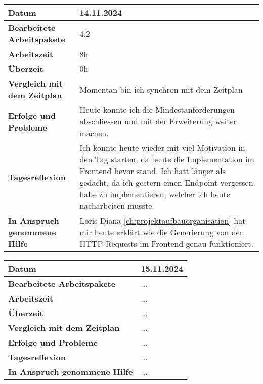 \begin{longtable}{p{}|p{}}
	\hline
	\textbf{Datum}                       & 14.11.2024            \\
	\hline
	\textbf{Bearbeitete Arbeitspakete}   & 4.2                  \\
	\hline
	\textbf{Arbeitszeit}                 & 8h                                    \\
	\hline
	\textbf{Überzeit}                    & 0h                                    \\
	\hline
	\textbf{Vergleich mit dem Zeitplan}  & Momentan bin ich synchron mit dem Zeitplan \\
	\hline
	\textbf{Erfolge und Probleme} & Heute konnte ich die Mindestanforderungen abschliessen und mit der Erweiterung weiter machen.
	\\
	\hline
	\textbf{Tagesreflexion} & Ich konnte heute wieder mit viel Motivation in den Tag starten, da heute die Implementation im Frontend bevor stand. Ich hatt länger als gedacht, da ich gestern einen Endpoint vergessen habe zu implementieren, welcher ich heute nacharbeiten musste.
	\\
	\hline
	\textbf{In Anspruch genommene Hilfe} & Loris Diana \ref{ch:projektaufbauorganisation} hat mir heute erklärt wie die Generierung von den HTTP-Requests im Frontend genau funktioniert.                              \\
	\hline
\end{longtable}\label{tab:arbeitsprotokoll-14.11.2024}
\newpage

\begin{longtable}{p{}|p{}}
	\hline
	\textbf{Datum}                       & 15.11.2024            \\
	\hline
	\textbf{Bearbeitete Arbeitspakete}   & ...                  \\
	\hline
	\textbf{Arbeitszeit}                 & ...                                    \\
	\hline
	\textbf{Überzeit}                    & ...                                    \\
	\hline
	\textbf{Vergleich mit dem Zeitplan}  & ... \\
	\hline
	\textbf{Erfolge und Probleme} & ...
	\\
	\hline
	\textbf{Tagesreflexion} & ...
	\\
	\hline
	\textbf{In Anspruch genommene Hilfe} & ...                              \\
	\hline
\end{longtable}\label{tab:arbeitsprotokoll-15.11.2024}
\newpage


